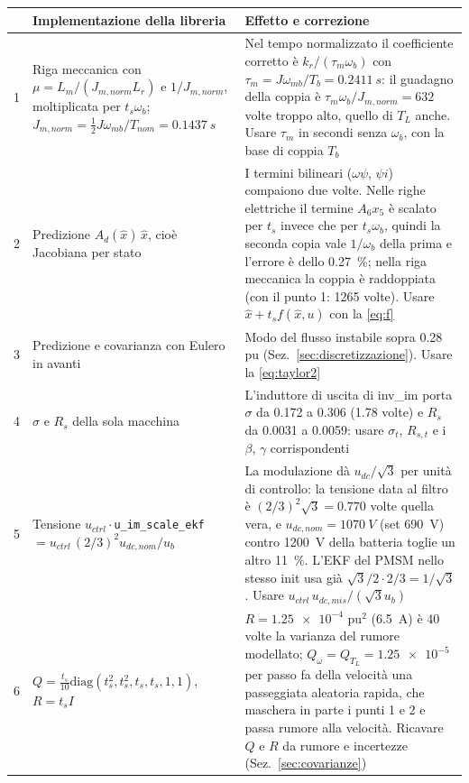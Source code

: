 \documentclass[10pt,a4paper]{scrartcl}
\newcommand{\code}[1]{\texttt{#1}}
\newcommand{\ts}{t_s}
\newcommand{\wb}{\omega_b}
\newcommand{\kr}{k_r}
\newcommand{\taum}{\tau_m}
\newcommand{\xh}{\hat{x}}
\begin{document}
\begin{onehalfspace}
\begin{table}[H]
\centering\small
\begin{tabular}{@{}R{0.6cm}R{6.6cm}R{8.3cm}@{}}
\toprule
& \textbf{Implementazione della libreria} & \textbf{Effetto e correzione} \\
 & Riga meccanica con $\mu = L_m/(J_{m,norm}L_r)$ e $1/J_{m,norm}$, moltiplicata per $\ts\wb$; $J_{m,norm} = \tfrac12 J\omega_{mb}/T_{nom} = \SI{0.1437}{s}$ & Nel tempo normalizzato il coefficiente corretto è $\kr/(\taum\wb)$ con $\taum = J\omega_{mb}/T_b = \SI{0.2411}{s}$: il guadagno della coppia è $\taum\wb/J_{m,norm} = \num{632}$ volte troppo alto, quello di $T_L$ anche. Usare $\taum$ in secondi senza $\wb$, con la base di coppia $T_b$ \\
2 & Predizione $A_d(\xh)\,\xh$, cioè Jacobiana per stato & I termini bilineari ($\omega\psi$, $\psi i$) compaiono due volte. Nelle righe elettriche il termine $A_6 x_5$ è scalato per $\ts$ invece che per $\ts\wb$, quindi la seconda copia vale $1/\wb$ della prima e l'errore è dello \SI{0.27}{\percent}; nella riga meccanica la coppia è raddoppiata (con il punto 1: \num{1265} volte). Usare $\xh + \ts f(\xh,u)$ con la \eqref{eq:f} \\
3 & Predizione e covarianza con Eulero in avanti & Modo del flusso instabile sopra \num{0.28} pu (Sez.~\ref{sec:discretizzazione}). Usare la \eqref{eq:taylor2} \\
4 & $\sigma$ e $R_s$ della sola macchina & L'induttore di uscita di inv\_im porta $\sigma$ da \num{0.172} a \num{0.306} (\num{1.78} volte) e $R_s$ da \num{0.0031} a \num{0.0059}: usare $\sigma_t$, $R_{s,t}$ e i $\beta$, $\gamma$ corrispondenti \\
5 & Tensione $u_{ctrl}\cdot$\code{u\_im\_scale\_ekf} $= u_{ctrl}\,(2/3)^2 u_{dc,nom}/u_b$ & La modulazione dà $u_{dc}/\sqrt3$ per unità di controllo: la tensione data al filtro è $(2/3)^2\sqrt3 = \num{0.770}$ volte quella vera, e $u_{dc,nom} = \SI{1070}{V}$ (set \SI{690}{V}) contro \SI{1200}{V} della batteria toglie un altro \SI{11}{\percent}. L'EKF del PMSM nello stesso init usa già $\sqrt3/2\cdot2/3 = 1/\sqrt3$. Usare $u_{ctrl}\,u_{dc,mis}/(\sqrt3 u_b)$ \\
6 & $Q = \tfrac{\ts}{10}\mathrm{diag}(\ts^2, \ts^2, \ts, \ts, 1, 1)$, $R = \ts I$ & $R = \num{1.25e-4}$ pu$^2$ (\SI{6.5}{A}) è 40 volte la varianza del rumore modellato; $Q_\omega = Q_{T_L} = \num{1.25e-5}$ per passo fa della velocità una passeggiata aleatoria rapida, che maschera in parte i punti 1 e 2 e passa rumore alla velocità. Ricavare $Q$ e $R$ da rumore e incertezze (Sez.~\ref{sec:covarianze}) \\

\end{tabular}
\end{table}
\end{onehalfspace}
\end{document}
